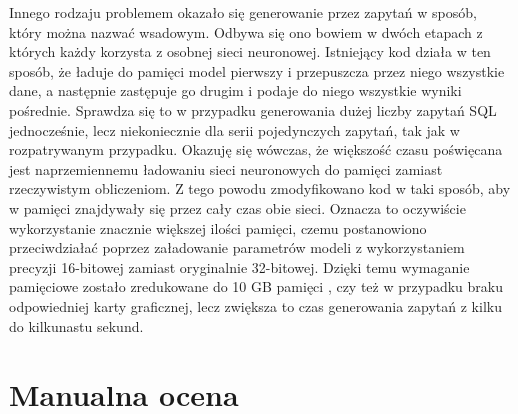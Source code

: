 Innego rodzaju problemem okazało się generowanie przez  zapytań w sposób, który można nazwać wsadowym. Odbywa się ono bowiem w dwóch etapach z których każdy korzysta z osobnej sieci neuronowej. Istniejący kod działa w ten sposób, że ładuje do pamięci model pierwszy i przepuszcza przez niego wszystkie dane, a następnie zastępuje go drugim i podaje do niego wszystkie wyniki pośrednie. Sprawdza się to w przypadku generowania dużej liczby zapytań SQL jednocześnie, lecz niekoniecznie dla serii pojedynczych zapytań, tak jak w rozpatrywanym przypadku. Okazuję się wówczas, że większość czasu poświęcana jest naprzemiennemu ładowaniu sieci neuronowych do pamięci zamiast rzeczywistym obliczeniom. Z tego powodu zmodyfikowano kod w taki sposób, aby w pamięci znajdywały się przez cały czas obie sieci. Oznacza to oczywiście wykorzystanie znacznie większej ilości pamięci, czemu postanowiono przeciwdziałać poprzez załadowanie parametrów modeli z wykorzystaniem precyzji 16-bitowej zamiast oryginalnie 32-bitowej. Dzięki temu wymaganie pamięciowe zostało zredukowane do 10 GB pamięci , czy też  w przypadku braku odpowiedniej karty graficznej, lecz zwiększa to czas generowania zapytań z kilku do kilkunastu sekund.

\section{Manualna ocena}
\lipsum[1-3]